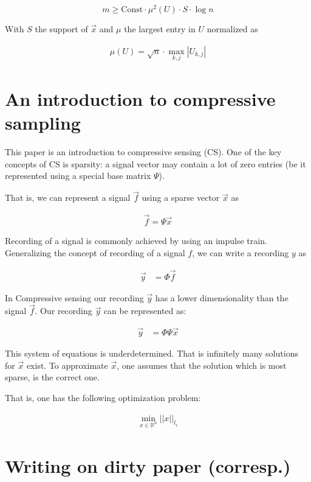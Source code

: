 \documentclass[report, oneside, a4paper, openany]{memoir}
\begin{document}
\begin{equation}
	m \geq \text{Const}\cdot \mu^2(U) \cdot S \cdot \log n
\end{equation}

With $S$ the support of $\vec{x}$ and $\mu$ the largest entry in $U$ normalized as

\begin{align*}
	\mu(U) = \sqrt{n} \cdot \max_{k,j} |U_{k,j}|
\end{align*}
\section{An introduction to compressive sampling \cite{candes2008introduction}}
This paper is an introduction to compressive sensing (CS). One of the key concepts of CS is sparsity: a signal vector may contain a lot of zero entries (be it represented using a special base matrix $\Psi$).

That is, we can represent a signal $\vec{f}$ using a sparse vector $\vec{x}$ as

\begin{align*}
  \vec{f} = \Psi \vec{x}
\end{align*}

Recording of a signal is commonly achieved by using an impulse train. Generalizing the concept of recording of a signal $f$, we can write a recording $y$ as

\begin{align*}
  \vec{y} &= \Phi \vec{f}
\end{align*}

In Compressive sensing our recording $\vec{y}$ has a lower dimensionality than
the signal $\vec{f}$. Our recording $\vec{y}$ can be represented as:

\begin{align} \label{eq:recording-system}
  \vec{y} &= \Phi \Psi \vec{x}
\end{align}

This system of equations is underdetermined. That is
infinitely many solutions for $\vec{x}$ exist. To approximate $\vec{x}$, one assumes that the solution which is most sparse, is the correct one.

That is, one has the following optimization problem:

\begin{align*}
  \min_{x \in \mathbb{R}^n} ||x||_{l_1}
\end{align*}
\section{Writing on dirty paper (corresp.) \cite{costa1983writing}}
\end{document}
